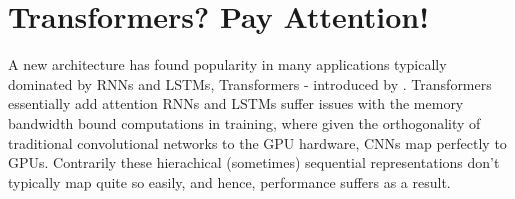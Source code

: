 \section{ Transformers? Pay Attention! }
A new architecture has found popularity in many applications typically dominated by RNNs and LSTMs, Transformers - introduced by \cite{DBLP:journals/corr/VaswaniSPUJGKP17}. Transformers essentially add attention 
RNNs and LSTMs suffer issues with the memory bandwidth bound computations in training, where given the orthogonality of traditional convolutional networks to the GPU hardware, CNNs map perfectly to GPUs. Contrarily these hierachical (sometimes) sequential representations don't typically map quite so easily, and hence, performance suffers as a result.\\
